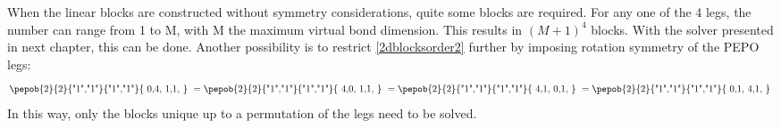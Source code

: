 When the linear blocks are constructed without symmetry considerations, quite some blocks are required. For any one of the 4 legs, the number can range from 1 to M, with M the maximum virtual bond dimension. This results in $(M+1)^4$ blocks. With the solver presented in next chapter, this can be done. Another possibility is to restrict \cref{2dblocksorder2} further by imposing rotation symmetry of the PEPO legs:
\begin{equation}\label{eq:rotsympepo}
    \vcenter{ \hbox{\pepob{2}{2}{{"1","1"}}{{"1","1"}}{{
                        0,4,
                        1,1,
                    }} } } =     \vcenter{ \hbox{\pepob{2}{2}{{"1","1"}}{{"1","1"}}{{
                        4,0,
                        1,1,
                    }} } } = \vcenter{ \hbox{\pepob{2}{2}{{"1","1"}}{{"1","1"}}{{
                        4,1,
                        0,1,
                    }} } }= \vcenter{ \hbox{\pepob{2}{2}{{"1","1"}}{{"1","1"}}{{
                        0,1,
                        4,1,
                    }} } }
\end{equation}
In this way, only the blocks unique up to a permutation of the legs need to be solved.

